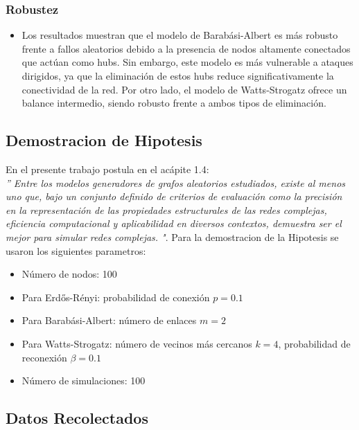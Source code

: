 \subsubsection{Robustez}
\begin{itemize}
    \item Los resultados muestran que el modelo de Barabási-Albert es más robusto frente a fallos aleatorios debido a la presencia de nodos altamente conectados que actúan como hubs. Sin embargo, este modelo es más vulnerable a ataques dirigidos, ya que la eliminación de estos hubs reduce significativamente la conectividad de la red. Por otro lado, el modelo de Watts-Strogatz ofrece un balance intermedio, siendo robusto frente a ambos tipos de eliminación.
\end{itemize}

\subsection{Demostracion de Hipotesis}
En el presente trabajo postula en el acápite 1.4:\\
\textit{''
Entre los modelos generadores de grafos aleatorios estudiados, existe al menos uno que,
bajo un conjunto definido de criterios de evaluación como la precisión en la representación de las propiedades 
estructurales de las redes complejas, eficiencia computacional y aplicabilidad en diversos contextos, demuestra ser 
el mejor para simular redes complejas.
"}.
Para la demostracion de la Hipotesis se usaron los siguientes parametros:
\begin{itemize}
    \item Número de nodos: 100
    \item Para Erdős-Rényi: probabilidad de conexión \(p = 0.1\)
    \item Para Barabási-Albert: número de enlaces \(m = 2\)
    \item Para Watts-Strogatz: número de vecinos más cercanos \(k = 4\), probabilidad de reconexión \(\beta = 0.1\)
    \item Número de simulaciones: 100
\end{itemize}

\subsection{Datos Recolectados}

